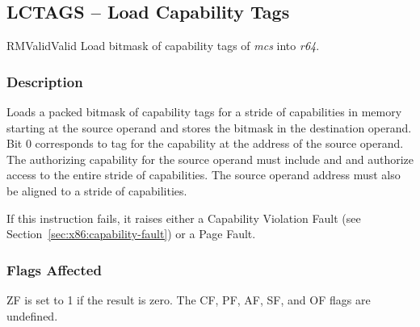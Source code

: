 \clearpage
{}
{}
\subsection*{LCTAGS -- Load Capability Tags}

\begin{x86opcodetable}
  {RM}{Valid}{Valid}
  {Load bitmask of capability tags of \emph{mcs} into \emph{r64}.}
\end{x86opcodetable}

\begin{x86opentable}
\end{x86opentable}

\subsubsection*{Description}

Loads a packed bitmask of capability tags for a stride of capabilities
in memory starting at the source operand and stores the bitmask in the
destination operand.  Bit 0 corresponds to tag for the capability at
the address of the source operand.  The authorizing capability for the
source operand must include \cappermL{} and \cappermLC{} and authorize
access to the entire stride of capabilities.  The source operand
address must also be aligned to a stride of capabilities.

If this instruction fails, it raises either a Capability Violation
Fault (see Section~\ref{sec:x86:capability-fault}) or a Page Fault.

\subsubsection*{Flags Affected}

ZF is set to 1 if the result is zero.  The CF, PF, AF, SF, and OF
flags are undefined.
